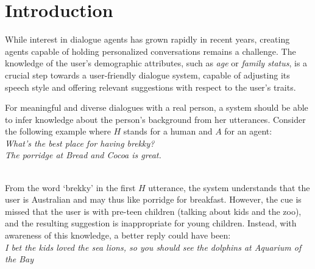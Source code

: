 \section{Introduction}

While interest in dialogue agents has grown rapidly in recent years, creating agents capable of holding personalized conversations remains a challenge. 
The knowledge of the user's demographic attributes, such as \textit{age} or \textit{family status}, is a crucial step towards a user-friendly dialogue system, capable of adjusting its speech style and offering relevant suggestions with respect to the user's traits.

For meaningful and diverse dialogues with a real person, a system should be able to infer knowledge about the person's background from her utterances. 
Consider the following example where $H$ stands for a human and $A$ for an agent:\vspace{0.1cm}\\
\hspace*{0.3cm}{H:} {\em What's the best place for having brekky?}\\
\hspace*{0.3cm}{A:} {\em The porridge at Bread and Cocoa is great.}\\
\\
\vspace{0.05cm}

\noindent From the word `brekky' in the first $H$ utterance, 
the system understands that the user is Australian
and may thus like porridge for breakfast. 
However, the 
cue is missed that the user 
{is with pre-teen children (talking about kids and the zoo)},
and the resulting suggestion is inappropriate for young children. 
Instead, with awareness of this knowledge, a better reply could have been:\vspace{0.1cm}\\
\hspace*{0.3cm}{A:} {\em I bet the kids loved the sea lions, so you should see the dolphins at Aquarium of the Bay}
\vspace{0.1cm}


